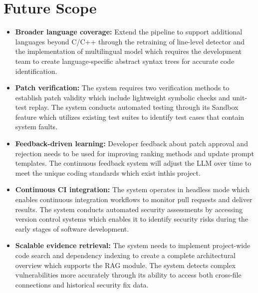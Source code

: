 \section{Future Scope}
\begin{itemize}
    \item \textbf{Broader language coverage:} Extend the pipeline to support additional languages beyond C/C++ through the retraining of line-level detector and the implementation of multilingual model which requires the development team to create language-specific abstract syntax trees for accurate code identification. 
    \item \textbf{Patch verification:} The system requires two verification methods to establish patch validity which include lightweight symbolic checks and unit-test replay. The system conducts automated testing through its Sandbox feature which utilizes existing test suites to identify test cases that contain system faults.
    \item \textbf{Feedback-driven learning:} Developer feedback about patch approval and rejection needs to be used for improving ranking methods and update prompt templates. The continuous feedback system will adjust the LLM over time to meet the unique coding standards which exist inthis project.
    \item \textbf{Continuous CI integration:} The system operates in headless mode which enables continuous integration workflows to monitor pull requests and deliver results. The system conducts automated security assessments by accessing version control systems which enables it to identify security risks during the early stages of software development.
    \item \textbf{Scalable evidence retrieval:} The system needs to implement project-wide code search and dependency indexing to create a complete architectural overview which supports the RAG module. The system detects complex vulnerabilities more accurately through its ability to access both cross-file connections and historical security fix data. 
\end{itemize}

